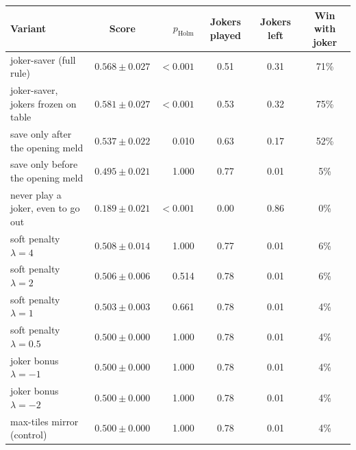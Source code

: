 \begin{tabular}{@{}lcrccc@{}}\toprule
Variant & Score & $p_{\text{Holm}}$ & Jokers played & Jokers left & Win with joker\\\midrule
joker-saver (full rule) & $0.568\pm0.027$ & $<0.001$ & 0.51 & 0.31 & 71\% \\
joker-saver, jokers frozen on table & $0.581\pm0.027$ & $<0.001$ & 0.53 & 0.32 & 75\% \\
save only after the opening meld & $0.537\pm0.022$ & 0.010 & 0.63 & 0.17 & 52\% \\
save only before the opening meld & $0.495\pm0.021$ & 1.000 & 0.77 & 0.01 & 5\% \\
never play a joker, even to go out & $0.189\pm0.021$ & $<0.001$ & 0.00 & 0.86 & 0\% \\
soft penalty $\lambda=4$ & $0.508\pm0.014$ & 1.000 & 0.77 & 0.01 & 6\% \\
soft penalty $\lambda=2$ & $0.506\pm0.006$ & 0.514 & 0.78 & 0.01 & 6\% \\
soft penalty $\lambda=1$ & $0.503\pm0.003$ & 0.661 & 0.78 & 0.01 & 4\% \\
soft penalty $\lambda=0.5$ & $0.500\pm0.000$ & 1.000 & 0.78 & 0.01 & 4\% \\
joker bonus $\lambda=-1$ & $0.500\pm0.000$ & 1.000 & 0.78 & 0.01 & 4\% \\
joker bonus $\lambda=-2$ & $0.500\pm0.000$ & 1.000 & 0.78 & 0.01 & 4\% \\
max-tiles mirror (control) & $0.500\pm0.000$ & 1.000 & 0.78 & 0.01 & 4\% \\
\bottomrule
\end{tabular}
